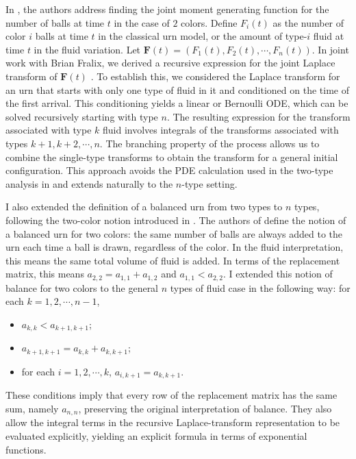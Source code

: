 \documentclass[11pt]{article}
\newenvironment{changemargin}[2]{%
\begin{list}{}{%
\setlength{\topsep}{0pt}%
\setlength{\leftmargin}{#1}%
\setlength{\rightmargin}{#2}%
\setlength{\listparindent}{\parindent}%
\setlength{\itemindent}{\parindent}%
\setlength{\parsep}{\parskip}%
}%
\item[]}{\end{list}}
\begin{document}
\begin{changemargin}{-0.5cm}{-0.5cm}
In \cite{KrennMahmoudWard2019}, the authors address finding the joint moment generating function for the number of balls at time $t$ in the case of $2$ colors. Define $F_i(t)$ as the number of color $i$ balls at time $t$ in the classical urn model, or the amount of type-$i$ fluid at time $t$ in the fluid variation. Let $\mathbf{F}(t) = (F_1(t),F_2(t),\cdots, F_n(t))$. In joint work with Brian Fralix, we derived a recursive expression for the joint Laplace transform of $\mathbf{F}(t)$ \cite{PittmanFralix2026Polya}. To establish this, we considered the Laplace transform for an urn that starts with only one type of fluid in it and conditioned on the time of the first arrival. This conditioning yields a linear or Bernoulli ODE, which can be solved recursively starting with type $n$.
The resulting expression for the transform associated with type $k$ fluid involves integrals of the transforms associated with types $k+1, k+2, \cdots, n$. The branching property of the process allows us to combine the single-type transforms to obtain the transform for a general initial configuration. This approach avoids the PDE calculation used in the two-type analysis in \cite{KrennMahmoudWard2019} and extends naturally to the $n$-type setting.

I also extended the definition of a balanced urn from two types to $n$ types, following the two-color notion introduced in \cite{ChenMahmoud2018}. The authors of \cite{ChenMahmoud2018} define the notion of a balanced urn for two colors: the same number of balls are always added to the urn each time a ball is drawn, regardless of the color. In the fluid interpretation, this means the same total volume of fluid is added. In terms of the replacement matrix, this means $a_{2,2} = a_{1,1} + a_{1,2}$ and $a_{1,1} < a_{2,2}$. 
I extended this notion of balance for two colors to the general $n$ types of fluid case in the following way: for each $k = 1, 2, \cdots, n-1$,
\begin{itemize}
    \item[(a)] $a_{k,k}<a_{k+1,k+1}$;
    \item[(b)] $a_{k+1,k+1} = a_{k,k} + a_{k,k+1}$;
    \item[(c)] for each $i =1,2,\cdots, k$, $a_{i,k+1}=a_{k,k+1}$.
\end{itemize}
These conditions imply that every row of the replacement matrix has the same sum, namely $a_{n,n}$, preserving the original interpretation of balance. 
They also allow the integral terms in the recursive Laplace-transform representation to be evaluated explicitly, yielding an explicit formula in terms of exponential functions.


\end{changemargin}
\end{document}
